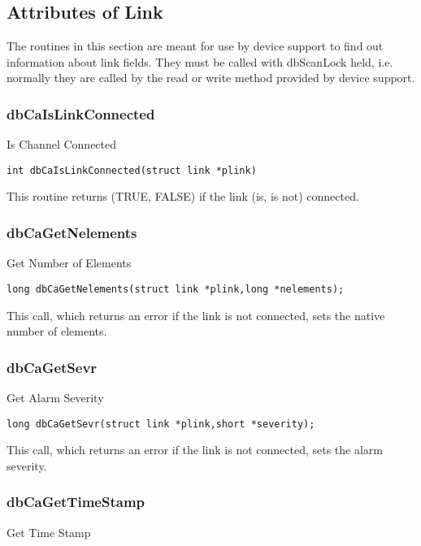 \subsection{Attributes of Link}

The routines in this section are meant for use by device support to find out information about link fields. They must be 
called with dbScanLock held, i.e. normally they are called by the read or write method provided by device support.

\subsubsection{dbCaIsLinkConnected}

Is Channel Connected

\begin{verbatim}int dbCaIsLinkConnected(struct link *plink)
\end{verbatim}This routine returns (TRUE, FALSE) if the link (is, is not) connected.

\subsubsection{dbCaGetNelements}

Get Number of Elements

\begin{verbatim}long dbCaGetNelements(struct link *plink,long *nelements);
\end{verbatim}This call, which returns an error if the link is not connected, sets the native number of elements.

\subsubsection{dbCaGetSevr}

Get Alarm Severity

\begin{verbatim}long dbCaGetSevr(struct link *plink,short *severity);
\end{verbatim}This call, which returns an error if the link is not connected, sets the alarm severity.

\subsubsection{dbCaGetTimeStamp}

Get Time Stamp


